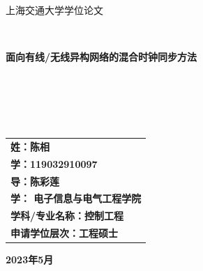 \documentclass[UTF8,a4paper,12pt]{ctexart}
\numberwithin{equation}{section}
\begin{document}
\thispagestyle{empty}

\renewcommand{\headrulewidth}{0pt}
\begin{figure}[htb] 
 \end{figure}

\begin{center}
\songti {} 上海交通大学学位论文
\end{center}
~\\
\begin{center}
\songti {} \textbf{面向有线/无线异构网络的混合时钟同步方法}
\end{center}
~\\
~\\
~\\
~\\
\begin{center}
\heiti {}
\begin{tabular}{l}
\textbf{姓：陈相}\\
\textbf{学：119032910097}\\
\textbf{导：陈彩莲}\\
\textbf{学： 电子信息与电气工程学院}\\
\textbf{学科/专业名称：控制工程}\\
\textbf{申请学位层次：工程硕士}\\
\end{tabular}
\end{center}
\vfill
\vspace{1em}

\begin{center}
\songti {} \textbf{2023年5月}
\end{center}
\end{document}
